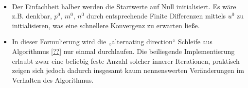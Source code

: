 \documentclass{mythesis}
\begin{document}
\begin{algorithm} \label{alg:complete}
     \\
    \begin{algorithmic}
	\EndFor
    \end{algorithmic}
    \begin{note}
	\begin{itemize}
	    \item
		Der Einfachheit halber werden die Startwerte auf Null initialisiert.
		Es wäre z.B. denkbar, $p^0$, $m^0$, $n^0$ durch entsprechende Finite Differenzen mittels $u^0$ zu initialisieren, was eine schnellere Konvergenz zu erwarten ließe.
	    \item
		In dieser Formulierung wird die „alternating direction“ Schleife aus Algorithmus \ref{??} nur einmal durchlaufen.
		Die beiliegende Implementierung erlaubt zwar eine beliebig feste Anzahl solcher innerer Iterationen, praktisch zeigen sich jedoch dadurch insgesamt kaum nennenswerten Veränderungen im Verhalten des Algorithmus.

\end{itemize}
\end{note}
\end{algorithm}
\end{document}

